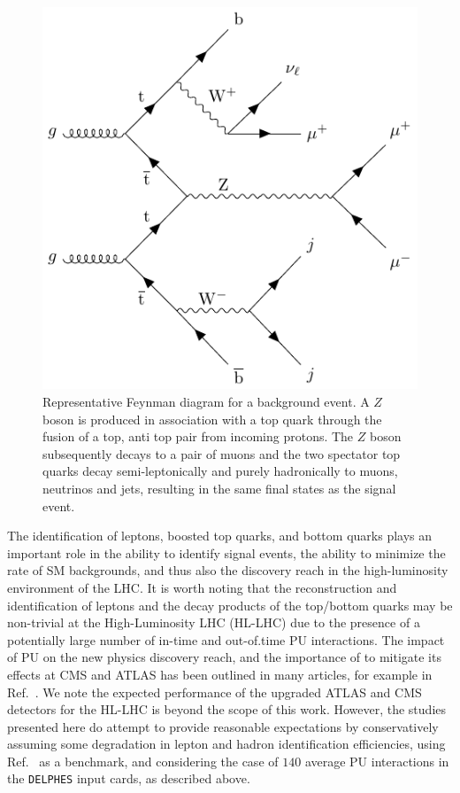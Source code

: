 \begin{figure}
\centering
\includegraphics[width=.75\linewidth]{Images/bg_Z_full.pdf}
\caption{Representative Feynman diagram for a background event. A $Z$ boson is produced in association with a top quark through the fusion of a top, anti top pair from incoming protons. The $Z$ boson subsequently decays to a pair of muons and the two spectator top quarks decay semi-leptonically and purely hadronically to muons, neutrinos and jets, resulting in the same final states as the signal event.\label{fig:v}}
\end{figure}

The identification of leptons, boosted top quarks, and bottom quarks plays an important role in the ability to identify signal events, the ability to minimize the rate of SM backgrounds, and thus also the discovery reach in the high-luminosity environment of the LHC. It is worth noting that the reconstruction and identification of leptons and the decay products of the top/bottom quarks may be non-trivial at the High-Luminosity LHC (HL-LHC) due to the presence of a potentially large number of in-time and out-of.time PU interactions. The impact of PU on the new physics discovery reach, and the importance of to mitigate its effects at CMS and ATLAS has been outlined in many articles, for example in Ref.~\parencite{CMS-PAS-FTR-13-014}. We note the expected performance of the upgraded ATLAS and CMS detectors for the HL-LHC is beyond the scope of this work. However, the studies presented here do attempt to provide reasonable expectations by conservatively assuming some degradation in lepton and hadron identification efficiencies, using Ref.~\parencite{CMS-PAS-FTR-13-014} as a benchmark, and considering the case of $140$ average PU interactions in the \texttt{DELPHES} input cards, as described above. 

